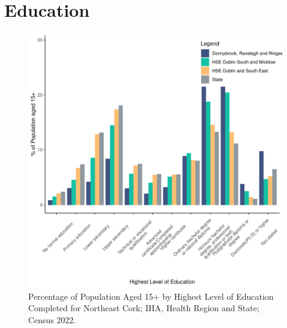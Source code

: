 \documentclass{article}
\begin{document}
\section{Education}\label{sect:Edu}
\begin{figure}[H]
	\centering
	\includegraphics[width = 120mm]{../figures/EduED.pdf}
	\caption{Percentage of Population Aged 15+ by Highest Level of Education Completed for Northeast Cork; IHA, Health Region and State; Census 2022.}
	\label{fig:vbnv}
	\end{figure}
\end{document}
